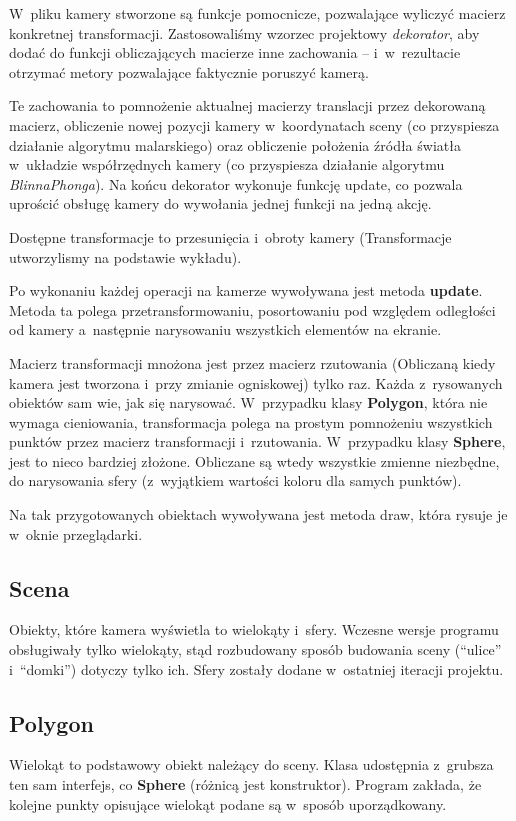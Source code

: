 \documentclass[a4paper]{article}
\begin{document}
{W~pliku kamery stworzone są funkcje pomocnicze, pozwalające wyliczyć macierz konkretnej transformacji.
Zastosowaliśmy wzorzec projektowy \emph{dekorator}, aby dodać do funkcji obliczających macierze inne zachowania --
i~w~rezultacie otrzymać metory pozwalające faktycznie poruszyć kamerą.

Te zachowania to pomnożenie aktualnej macierzy translacji przez dekorowaną macierz, obliczenie nowej pozycji kamery w~koordynatach sceny (co przyspiesza działanie algorytmu malarskiego) oraz obliczenie położenia źródła światła w~układzie współrzędnych kamery (co przyspiesza działanie algorytmu \emph{Blinna\dywiz Phonga}).
Na końcu dekorator wykonuje funkcję update, co pozwala uprościć obsługę kamery do wywołania jednej funkcji na jedną akcję.

Dostępne transformacje to przesunięcia i~obroty kamery (Transformacje utworzylismy na podstawie wykładu\cite{dasa}).

Po wykonaniu każdej operacji na kamerze wywoływana jest metoda \textbf{update}.
Metoda ta polega przetransformowaniu, posortowaniu pod względem odległości od kamery a~następnie narysowaniu wszystkich elementów na ekranie. 

Macierz transformacji mnożona jest przez macierz rzutowania (Obliczaną kiedy kamera jest tworzona i~przy zmianie ogniskowej)\cite{openGL} tylko raz.
Każda z~rysowanych obiektów sam wie, jak się narysować.
W~przypadku klasy \textbf{Polygon}, która nie wymaga cieniowania, transformacja polega na prostym pomnożeniu wszystkich punktów przez macierz transformacji i~rzutowania.
W~przypadku klasy \textbf{Sphere}, jest to nieco bardziej złożone.
Obliczane są wtedy wszystkie zmienne niezbędne, do narysowania sfery (z~wyjątkiem wartości koloru dla samych punktów).

Na tak przygotowanych obiektach wywoływana jest metoda draw, która rysuje je w~oknie przeglądarki.

\subsection{Scena}
Obiekty, które kamera wyświetla to wielokąty i~sfery.
Wczesne wersje programu obsługiwały tylko wielokąty, stąd rozbudowany sposób budowania sceny (``ulice'' i~``domki'') dotyczy tylko ich.
Sfery zostały dodane w~ostatniej iteracji projektu.
\subsection{Polygon}
Wielokąt to podstawowy obiekt należący do sceny.
Klasa udostępnia z~grubsza ten sam interfejs, co \textbf{Sphere} (różnicą jest konstruktor).
Program zakłada, że kolejne punkty opisujące wielokąt podane są w~sposób uporządkowany.

}
\end{document}
